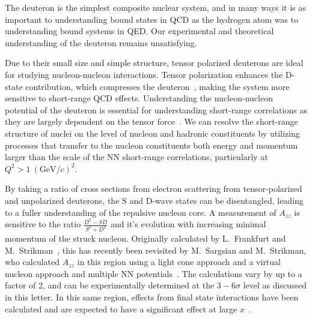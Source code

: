 
The deuteron is the simplest composite nuclear system, and in many ways it is as important to understanding bound states in QCD as the hydrogen atom was to understanding bound systems in QED.  Our experimental and theoretical understanding of the deuteron remains unsatisfying. 

Due to their small size and simple structure, tensor polarized deuterons are ideal for studying nucleon-nucleon interactions. Tensor polarization enhances the D-state contribution, which compresses the deuteron~\cite{Forest:1996kp}, 
making the system more sensitive to short-range QCD effects. Understanding the nucleon-nucleon potential of the deuteron is essential for understanding short-range correlations as they are largely dependent on the tensor force~\cite{Arrington:2011xs}. We can resolve the short-range structure of nuclei on the level of nucleon and hadronic constituents by utilizing processes that transfer to the nucleon constituents both energy and momentum larger than the scale of the NN short-range correlations, particularly at $Q^2>1~(\mathrm{GeV}/c)^2$.


By taking a ratio of cross sections from electron scattering from tensor-polarized and unpolarized deuterons, the S and D-wave states can be disentangled, leading to a fuller understanding of the repulsive nucleon core. A measurement of $A_{zz}$ is sensitive to the ratio $\frac{D^2-SD}{S^2+D^2}$ and it's evolution with increasing minimal momentum of the struck nucleon. Originally calculated by L.~Frankfurt and M.~Strikman~\cite{Frankfurt:1988nt}, this has recently been revisited by M.~Sargsian and M.~Strikman, who calculated $A_{zz}$ in this region using a light cone approach and a virtual nucleon approach and multiple NN potentials~\cite{Sargsian:2014fla}. The calculations vary by up to a factor of 2, and can be experimentally determined at the $3-6\sigma$ level as discussed in this letter. In this same region, effects from final state interactions have been calculated and are expected to have a significant effect at large $x$~\cite{cosyn-convo}.


